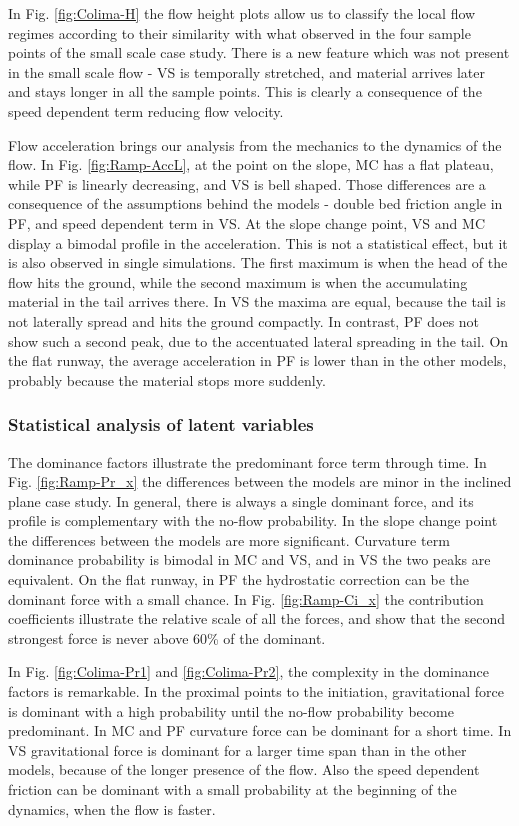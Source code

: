 \documentclass{article}
\begin{document}
In Fig. \ref{fig:Colima-H} the flow height plots allow us to classify the local flow regimes according to their similarity with what observed in the four sample points of the small scale case study. There is a new feature which was not present in the small scale flow - VS is temporally stretched, and material arrives later and stays longer in all the sample points. This is clearly a consequence of the speed dependent term reducing flow velocity.

Flow acceleration brings our analysis from the mechanics to the dynamics of the flow. In Fig. \ref{fig:Ramp-AccL}, at the point on the slope, MC has a flat plateau, while PF is linearly decreasing, and VS is bell shaped. Those differences are a consequence of the assumptions behind the models - double bed friction angle in PF, and speed dependent term in VS. At the slope change point, VS and MC display a bimodal profile in the acceleration. This is not a statistical effect, but it is also observed in single simulations. The first maximum is when the head of the flow hits the ground, while the second maximum is when the accumulating material in the tail arrives there. In VS the maxima are equal, because the tail is not laterally spread and hits the ground compactly. In contrast, PF does not show such a second peak, due to the accentuated lateral spreading in the tail. On the flat runway, the average acceleration in PF is lower than in the other models, probably because the material stops more suddenly.

\subsubsection{Statistical analysis of latent variables}
The dominance factors illustrate the predominant force term through time. In Fig. \ref{fig:Ramp-Pr_x} the differences between the models are minor in the inclined plane case study. In general, there is always a single dominant force, and its profile is complementary with the no-flow probability. In the slope change point the differences between the models are more significant. Curvature term dominance probability is bimodal in MC and VS, and in VS the two peaks are equivalent. On the flat runway, in PF the hydrostatic correction can be the dominant force with a small chance. In Fig. \ref{fig:Ramp-Ci_x} the contribution coefficients illustrate the relative scale of all the forces, and show that the second strongest force is never above 60\% of the dominant. 

In Fig. \ref{fig:Colima-Pr1} and \ref{fig:Colima-Pr2}, the complexity in the dominance factors is remarkable. In the proximal points to the initiation, gravitational force is dominant with a high probability until the no-flow probability become predominant. In MC and PF curvature force can be dominant for a short time. In VS gravitational force is dominant for a larger time span than in the other models, because of the longer presence of the flow. Also the speed dependent friction can be dominant with a small probability at the beginning of the dynamics, when the flow is faster.
\end{document}
